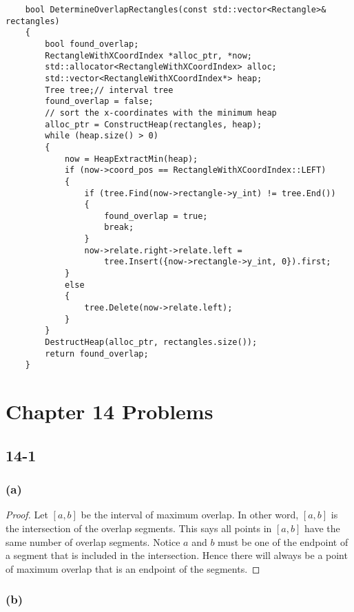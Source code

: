 \begin{verbatim}
    bool DetermineOverlapRectangles(const std::vector<Rectangle>& rectangles)
    {
        bool found_overlap;
        RectangleWithXCoordIndex *alloc_ptr, *now;
        std::allocator<RectangleWithXCoordIndex> alloc;
        std::vector<RectangleWithXCoordIndex*> heap;
        Tree tree;// interval tree
        found_overlap = false;
        // sort the x-coordinates with the minimum heap
        alloc_ptr = ConstructHeap(rectangles, heap);
        while (heap.size() > 0)
        {
            now = HeapExtractMin(heap);
            if (now->coord_pos == RectangleWithXCoordIndex::LEFT)
            {
                if (tree.Find(now->rectangle->y_int) != tree.End())
                {
                    found_overlap = true;
                    break;
                }
                now->relate.right->relate.left = 
                    tree.Insert({now->rectangle->y_int, 0}).first;
            }
            else
            {
                tree.Delete(now->relate.left);
            }
        }
        DestructHeap(alloc_ptr, rectangles.size());
        return found_overlap;
    }
\end{verbatim}

\section*{Chapter 14 Problems}

\subsection*{14-1}

\subsubsection*{(a)}

\begin{proof}
    Let $[a,b]$ be the interval of maximum overlap.
    In other word, $[a,b]$ is the intersection of the overlap segments.
    This says all points in $[a,b]$ have the same number of overlap segments.
    Notice $a$ and $b$ must be one of the endpoint of a segment that is included in the intersection.
    Hence there will always be a point of maximum overlap that is an endpoint of the segments.
\end{proof}

\subsubsection*{(b)}

